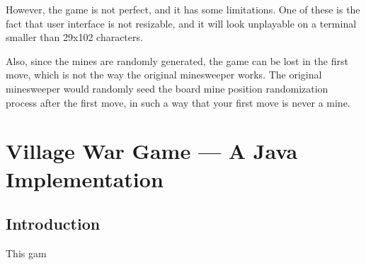 \documentclass{article}
\begin{document}
However, the game is not perfect, and it has some limitations. One of these is the fact that
user interface is not resizable, and it will look unplayable on a terminal smaller than
29x102 characters.

Also, since the mines are randomly generated, the game can be lost in the first move, which is not the way 
the original minesweeper works. The original minesweeper would randomly seed the board mine position randomization process
 after the first move, in such a way that your first move is never a mine.

 \newpage

\section{Village War Game --- A Java Implementation}

\subsection{Introduction}
This gam
\end{document}
